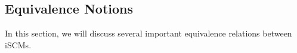 \subsection{Equivalence Notions}

In this section, we will discuss several important equivalence relations between iSCMs.


